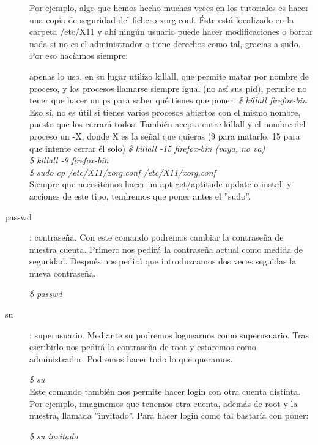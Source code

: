 \documentclass[12pt,spanish,lettersize,twocolumn]{article}
\begin{document}
\begin{description}
Por ejemplo, algo que hemos hecho muchas veces en los tutoriales es hacer una copia de seguridad del fichero xorg.conf. \'Este est\'a localizado en la carpeta /etc/X11 y ah\'i ningún usuario puede hacer modificaciones o borrar nada si no es el administrador o tiene derechos como tal, gracias a sudo. Por eso hac\'iamos siempre:

apenas lo uso, en su lugar utilizo killall, que permite matar por nombre de proceso, y los procesos llamarse siempre igual (no as\'i sus pid), permite no tener que hacer un ps para saber qu\'e tienes que poner.
\emph{\$ killall firefox-bin}\\
Eso s\'i, no es útil si tienes varios procesos abiertos con el mismo nombre, puesto que los cerrar\'a todos.
Tambi\'en acepta entre killall y el nombre del proceso un -X, donde X es la se\~nal que quieras (9 para matarlo, 15 para que intente cerrar \'el solo)
\emph{\$ killall -15 firefox-bin (vaya, no va)}\\
\emph{\$ killall -9 firefox-bin}\\

\emph{\$ sudo cp /etc/X11/xorg.conf /etc/X11/xorg.conf}\\

Siempre que necesitemos hacer un apt-get/aptitude update o install y acciones de este tipo, tendremos que poner antes el ''sudo''.

\item[passwd]: contrase\~na. Con este comando podremos cambiar la contrase\~na de nuestra cuenta. Primero nos pedir\'a la contrase\~na actual como medida de seguridad. Despu\'es nos pedir\'a que introduzcamos dos veces seguidas la nueva contrase\~na.

\emph{\$ passwd}\\

\item[su]: superusuario. Mediante su podremos loguearnos como superusuario. Tras escribirlo nos pedir\'a la contrase\~na de root y estaremos como administrador. Podremos hacer todo lo que queramos.

\emph{\$ su}\\

Este comando tambi\'en nos permite hacer login con otra cuenta distinta. Por ejemplo, imaginemos que tenemos otra cuenta, adem\'as de root y la nuestra, llamada ''invitado''. Para hacer login como tal bastar\'ia con poner:

\emph{\$ su invitado}\\


\end{description}
\end{document}
